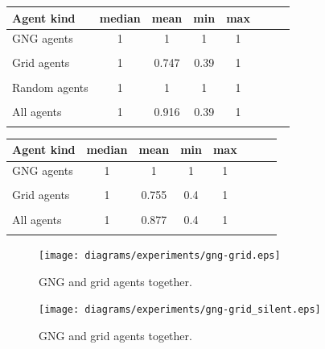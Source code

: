 \begin{center} 
  \begin{tabular}{l*{6}{c}r}
  Agent kind        & median & mean & min & max \\
  \hline
  GNG agents        & 1 & 1 & 1 & 1  \\
                    &   \\
  Grid agents       & 1                     & 0.747                 & 0.39                & 1  \\  
                    & \color{green}{+0.39}  & \color{green}{0.026}  & \color{red}{-0.08}  \\
  Random agents     & 1 & 1 & 1 & 1  \\         
                    & \\
  All agents        & 1 & 0.916                 & 0.39 & 1  \\  
                    &   & \color{green}{+0.092}  & \color{red}{-0.05} \\
  \end{tabular}                                        
\end{center}

\begin{center}
  \begin{tabular}{l*{6}{c}r}
  Agent kind        & median & mean & min & max \\
  \hline
  GNG agents        & 1 & 1 & 1 & 1  \\   
                    & \\
  Grid agents       & 1 & 0.755                 & 0.4 & 1  \\  
                    &   & \color{green}{+0.008} & \color{green}{+0.01}  \\
  All agents        & 1 & 0.877               & 0.4 & 1  \\
                    &   & \color{red}{-0.039} & \color{green}{0.01} \\
  \end{tabular}                                 
\end{center}



\begin{figure}[h!]
  \centering                                
  \texttt{[image: diagrams/experiments/gng-grid.eps]}    
  \caption{GNG and grid agents together.}
  \label{experiments:gng-grid}
\end{figure}

\begin{figure}[h!]
  \centering                                
  \texttt{[image: diagrams/experiments/gng-grid\_silent.eps]}    
  \caption{GNG and grid agents together.}
  \label{experiments:gng-grid-silent}
\end{figure}